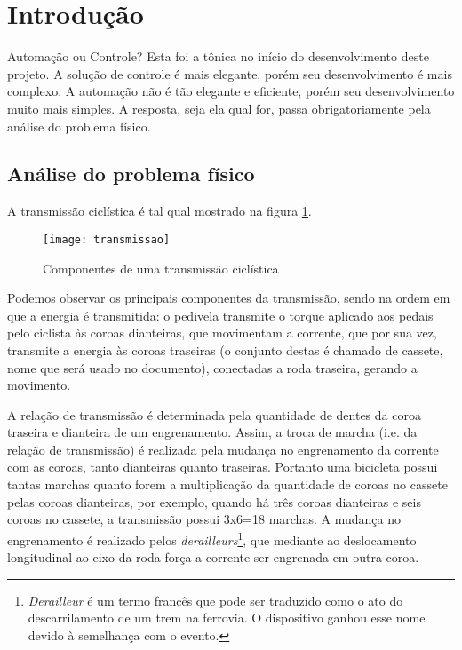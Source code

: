 \documentclass[a4paper,11pt]{article}
\begin{document}
\pagebreak
%
\section{Introdução}
\label{sec:intro}
Automação ou Controle? Esta foi a tônica no início do desenvolvimento
deste projeto. A solução de controle é mais elegante, porém seu desenvolvimento
é mais complexo. A automação não é tão elegante e eficiente, porém seu
desenvolvimento muito mais simples. A resposta, seja ela qual for, passa
obrigatoriamente pela análise do problema físico.

\subsection{Análise do problema físico}
A transmissão ciclística é tal qual mostrado na figura \ref{fig:transmissao}.
\begin{figure}[ht]
\begin{center}
 \texttt{[image: transmissao]}
\end{center}
  \caption{Componentes de uma transmissão ciclística}
  \label{fig:transmissao}
\end{figure}
Podemos observar os principais componentes da transmissão, sendo na ordem em que
a energia é transmitida: o pedivela transmite o torque aplicado aos pedais pelo
ciclista às coroas dianteiras, que movimentam a corrente, que por sua vez,
transmite a energia às coroas traseiras (o conjunto destas é chamado de cassete,
nome que será usado no documento), conectadas a roda traseira, gerando a
movimento.

A relação de transmissão é determinada pela quantidade de dentes da coroa
traseira e dianteira de um engrenamento. Assim, a troca de marcha
(i.e. da relação de transmissão) é realizada pela mudança no engrenamento da
corrente com as coroas, tanto dianteiras  quanto traseiras. Portanto uma
bicicleta possui tantas marchas quanto forem a multiplicação da quantidade de
coroas no cassete pelas coroas dianteiras, por exemplo, quando há três coroas
dianteiras e seis coroas no cassete, a transmissão possui 3x6=18 marchas.
A mudança no engrenamento é realizado pelos
\textit{derailleurs}\footnote{\textit{Derailleur} é um termo francês que pode
ser traduzido como o ato do descarrilamento de um trem na ferrovia. O
dispositivo ganhou esse nome devido à semelhança com o evento.}, que mediante ao
deslocamento longitudinal ao eixo da roda força a corrente ser engrenada em
outra coroa.
\end{document}
